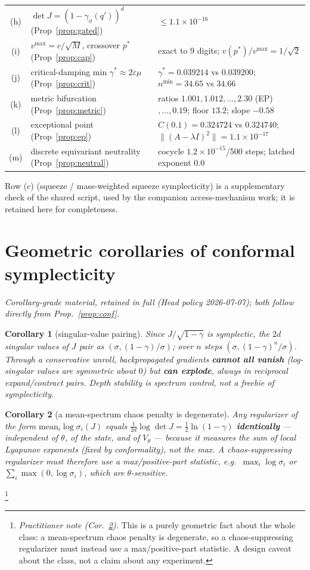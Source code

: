 \documentclass[11pt]{article}
\theoremstyle{plain}
\newtheorem{corollary}{Corollary}
\theoremstyle{definition}
\newcommand{\half}{\tfrac12}
\begin{document}
\begin{center}
{\begin{tabular}{cll}
(h) & $\det J=(1-\gamma_\phi(q'))^d$ (Prop~\ref{prop:gated}) & $\le1.1\times10^{-16}$ \\
(i) & $v^{\max}=c/\sqrt M$, crossover $p^*$ (Prop~\ref{prop:cap}) & exact to 9 digits; $v(p^*)/v^{\max}=1/\sqrt2$ \\
(j) & critical-damping min $\gamma^*\approx2\varepsilon\mu$ (Prop~\ref{prop:crit}) & $\gamma^*=0.039214$ vs $0.039200$; $n^{\min}=34.65$ vs $34.66$ \\
(k) & metric bifurcation (Prop~\ref{prop:metric}) & ratios $1.001,1.012,\dots,2.30$ (EP)$,\dots,0.19$; floor $13.2$; slope $-0.58$ \\
(l) & exceptional point (Prop~\ref{prop:ep}) & $C(0.1)=0.324724$ vs $0.324740$; $\lVert(A-\lambda I)^2\rVert=1.1\times10^{-17}$ \\
(m) & discrete equivariant neutrality (Prop~\ref{prop:neutral}) & cocycle $1.2\times10^{-15}$/500 steps; latched exponent $0.0$ \\
\bottomrule
\end{tabular}}
\end{center}
Row (c) (squeeze / mass-weighted squeeze symplecticity) is a supplementary check of the shared script, used by the companion access-mechanism work; it is retained here for completeness.

\appendix
\section{Geometric corollaries of conformal symplecticity}\label{app:cor}
\emph{Corollary-grade material, retained in full (Head policy 2026-07-07); both follow directly from Prop.~\ref{prop:conf}.}
\begin{corollary}[singular-value pairing]\label{cor:sv}
Since $J/\sqrt{1-\gamma}$ is symplectic, the $2d$ singular values of $J$ pair as $(\sigma,(1-\gamma)/\sigma)$; over $n$ steps $(\sigma,(1-\gamma)^n/\sigma)$. Through a conservative unroll, backpropagated gradients \textbf{cannot all vanish} (log-singular values are symmetric about $0$) but \textbf{can explode}, always in reciprocal expand/contract pairs. Depth stability is spectrum \emph{control}, not a freebie of symplecticity.
\end{corollary}
\begin{corollary}[a mean-spectrum chaos penalty is degenerate]\label{cor:mean}
Any regularizer of the form $\mathrm{mean}_i\log\sigma_i(J)$ equals $\tfrac{1}{2d}\log\det J=\half\ln(1-\gamma)$ \textbf{identically} --- independent of $\theta$, of the state, and of $V_\theta$ --- because it measures the \emph{sum} of local Lyapunov exponents (fixed by conformality), not the \emph{max}. A chaos-suppressing regularizer must therefore use a max/positive-part statistic, e.g.\ $\max_i\log\sigma_i$ or $\sum_i\max(0,\log\sigma_i)$, which are $\theta$-sensitive.
\end{corollary}
\footnote{\emph{Practitioner note (Cor.~\ref{cor:mean}).} This is a purely geometric fact about the whole class: a mean-spectrum chaos penalty is degenerate, so a chaos-suppressing regularizer must instead use a max/positive-part statistic. A design caveat about the class, not a claim about any experiment.}
\end{document}
